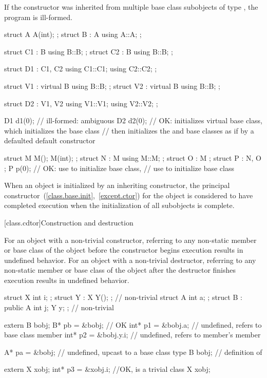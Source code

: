 \pnum
If the constructor was inherited from multiple base class subobjects
of type , the program is ill-formed.
\enterexample
\begin{codeblock}
struct A { A(int); };
struct B : A { using A::A; };

struct C1 : B { using B::B; };
struct C2 : B { using B::B; };

struct D1 : C1, C2 {
  using C1::C1;
  using C2::C2;
};

struct V1 : virtual B { using B::B; };
struct V2 : virtual B { using B::B; };

struct D2 : V1, V2 {
  using V1::V1;
  using V2::V2;
};

D1 d1(0); // ill-formed: ambiguous
D2 d2(0); // OK: initializes virtual  base class, which initializes the  base class
          // then initializes the  and  base classes as if by a defaulted default constructor

struct M { M(); M(int); };
struct N : M { using M::M; };
struct O : M {};
struct P : N, O {};
P p(0); // OK: use  to initialize  base class,
        // use  to initialize  base class
\end{codeblock}
\exitexample

\pnum
When an object is initialized by an inheriting constructor,
the principal constructor~(\ref{class.base.init},~\ref{except.ctor})
for the object is considered to have completed execution
when the initialization of all subobjects is complete.

[class.cdtor]{Construction and destruction}%
%

\pnum
{}%
%
For an object with a non-trivial constructor, referring to any non-static member
or base class of the object before the constructor begins execution results in
undefined behavior. For an object with a non-trivial destructor, referring to
any non-static member or base class of the object after the destructor finishes
execution results in undefined behavior.
\enterexample

\begin{codeblock}
struct X { int i; };
struct Y : X { Y(); };                  // non-trivial
struct A { int a; };
struct B : public A { int j; Y y; };    // non-trivial

extern B bobj;
B* pb = &bobj;                          // OK
int* p1 = &bobj.a;                      // undefined, refers to base class member
int* p2 = &bobj.y.i;                    // undefined, refers to member's member

A* pa = &bobj;                          // undefined, upcast to a base class type
B bobj;                                 // definition of 

extern X xobj;
int* p3 = &xobj.i;                      //OK,  is a trivial class
X xobj;
\end{codeblock}

